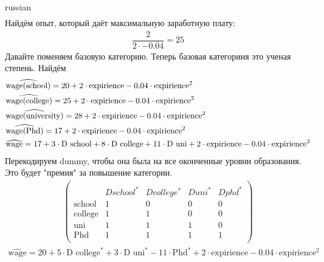 \documentclass{article}
\begin{document}
\begin{otherlanguage*}{russian}
\begin{align*}
\end{align*}
Найдём опыт, который даёт максимальную заработную плату: 
\begin{align*}
\dfrac{2}{2 \cdot -0.04} = 25 
\end{align*}
Давайте поменяем базовую категорию. Теперь базовая категориия это ученая степень. Найдём 
\begin{align*}
&\widehat{\text{wage(\text{school})}} = 20 + 2 \cdot \text{expirience} - 0.04 \cdot \text{expirience} ^ 2  \\
&\widehat{\text{wage(\text{college})}} = 25 + 2 \cdot \text{expirience} - 0.04 \cdot \text{expirience} ^ 2  \\
&\widehat{\text{wage(\text{university})}} = 28 + 2 \cdot \text{expirience} - 0.04 \cdot \text{expirience} ^ 2  \\
&\widehat{\text{wage(\text{Phd})}} = 17 + 2 \cdot \text{expirience} - 0.04 \cdot \text{expirience} ^ 2  \\
& \widehat{\text{wage}} = 17 + 3 \cdot \text{D school} + 8 \cdot \text{D college} + 11 \cdot \text{D uni}  + 2 \cdot \text{expirience} - 0.04 \cdot \text{expirience} ^ 2
\end{align*}
Перекодируем dummy, чтобы она была на все оконченные уровни образования. Это будет "премия" за повышение категории. 
\begin{align*}
\begin{pmatrix} \\
 & Dschool^* & Dcollege^* & Duni^* & Dphd^* \\
\text{school} & 1 & 0 & 0 & 0 \\
\text{college} & 1 & 1 & 0 & 0 \\
\text{uni} & 1 & 1 & 1 & 0 \\
\text{Phd} & 1 & 1 & 1 & 1 \\
\end{pmatrix}
\end{align*}
\begin{align*}
\widehat{\text{wage}} =  20 + 5 \cdot \text{D college}^* + 3 \cdot \text{D uni}^*  -11  \cdot \text{Phd}^* +  2 \cdot \text{expirience} - 0.04 \cdot \text{expirience} ^ 2
\end{align*}

\end{otherlanguage*}
\end{document}
